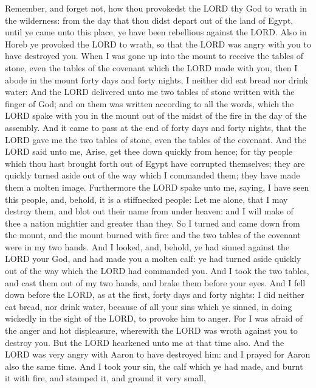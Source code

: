  Remember, and forget not, how thou provokedst the LORD
thy God to wrath in the wilderness: from the day that thou didst depart
out of the land of Egypt, until ye came unto this place, ye have been
rebellious against the LORD.  Also in Horeb ye provoked the
LORD to wrath, so that the LORD was angry with you to have destroyed
you.  When I was gone up into the mount to receive the
tables of stone, even the tables of the covenant which the LORD made
with you, then I abode in the mount forty days and forty nights, I
neither did eat bread nor drink water:  And the LORD
delivered unto me two tables of stone written with the finger of God;
and on them was written according to all the words, which the LORD spake
with you in the mount out of the midst of the fire in the day of the
assembly.  And it came to pass at the end of forty days and
forty nights, that the LORD gave me the two tables of stone, even the
tables of the covenant.  And the LORD said unto me, Arise,
get thee down quickly from hence; for thy people which thou hast brought
forth out of Egypt have corrupted themselves; they are quickly turned
aside out of the way which I commanded them; they have made them a
molten image.  Furthermore the LORD spake unto me, saying,
I have seen this people, and, behold, it is a stiffnecked people:
 Let me alone, that I may destroy them, and blot out their
name from under heaven: and I will make of thee a nation mightier and
greater than they.  So I turned and came down from the
mount, and the mount burned with fire: and the two tables of the
covenant were in my two hands.  And I looked, and, behold,
ye had sinned against the LORD your God, and had made you a molten calf:
ye had turned aside quickly out of the way which the LORD had commanded
you.  And I took the two tables, and cast them out of my
two hands, and brake them before your eyes.  And I fell
down before the LORD, as at the first, forty days and forty nights: I
did neither eat bread, nor drink water, because of all your sins which
ye sinned, in doing wickedly in the sight of the LORD, to provoke him to
anger.  For I was afraid of the anger and hot displeasure,
wherewith the LORD was wroth against you to destroy you. But the LORD
hearkened unto me at that time also.  And the LORD was very
angry with Aaron to have destroyed him: and I prayed for Aaron also the
same time.  And I took your sin, the calf which ye had
made, and burnt it with fire, and stamped it, and ground it very small,
